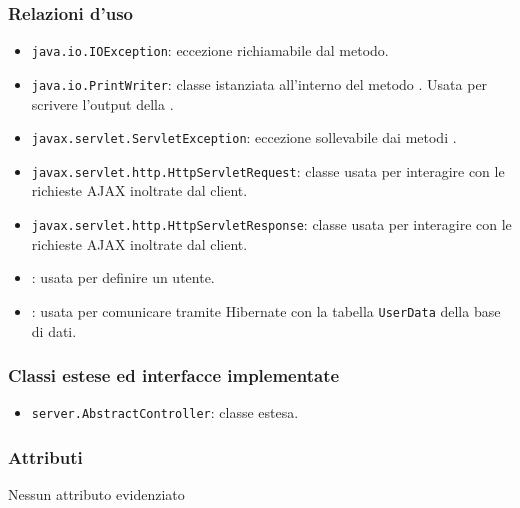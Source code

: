 \subsubsection*{Relazioni d'uso}
\begin{itemize}
\item \texttt{java.io.IOException}: eccezione richiamabile dal metodo.
	\item \texttt{java.io.PrintWriter}: classe istanziata all'interno del metodo . Usata per scrivere l'output della .
	\item \texttt{javax.servlet.ServletException}: eccezione sollevabile dai metodi .
	\item \texttt{javax.servlet.http.HttpServletRequest}: classe usata per interagire con le richieste AJAX inoltrate dal client.
	\item \texttt{javax.servlet.http.HttpServletResponse}: classe usata per interagire con le richieste AJAX inoltrate dal client.
	\item {}: usata per definire un utente.
	\item {}: usata per comunicare tramite Hibernate con la tabella \texttt{UserData} della base di dati.
\end{itemize}

\subsubsection*{Classi estese ed interfacce implementate}
\begin{itemize}
	\item \texttt{server.AbstractController}: classe estesa.
\end{itemize}

\subsubsection*{Attributi}

Nessun attributo evidenziato

